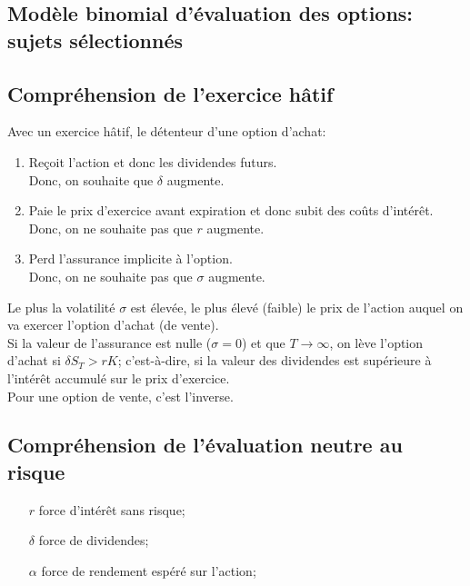 \documentclass[10pt, french]{article}
\begin{document}
\begin{multicols*}{2}
\newpage

\section{Modèle binomial d’évaluation des options: sujets sélectionnés}

\subsection*{Compréhension de l'exercice hâtif}

Avec un exercice hâtif, le détenteur d'une option d'achat:
\begin{enumerate}[leftmargin = *]
	\item	Reçoit l'action et donc les dividendes futurs.	\\
			Donc, on souhaite que $\delta$ augmente.
	\item	Paie le prix d'exercice avant expiration et donc subit des coûts d'intérêt.	\\
			Donc, on ne souhaite pas que $r$ augmente.
	\item	Perd l'assurance implicite à l'option.	\\
			Donc, on ne souhaite pas que $\sigma$ augmente.
\end{enumerate}

Le plus la volatilité $\sigma$ est élevée, le plus élevé (faible) le prix de l'action auquel on va exercer l'option d'achat (de vente).\\

Si la valeur de l'assurance est nulle ($\sigma = 0$) et que $T \rightarrow \infty$, on lève l'option d'achat si $\delta S_{T} > r K$; c'est-à-dire, si la valeur des dividendes est supérieure à l'intérêt accumulé sur le prix d'exercice.\\

Pour une option de vente, c'est l'inverse.

\subsection*{Compréhension de l'évaluation neutre au risque}

\begin{distributions}[Notation]
\begin{itemize}[leftmargin = *]
	\item[$r$]	force d'intérêt sans risque;
	\item[$\delta$]	force de dividendes;
	\item[$\alpha$]	force de rendement espéré sur l'action;
\end{itemize}
\end{distributions}


\end{multicols*}
\end{document}

